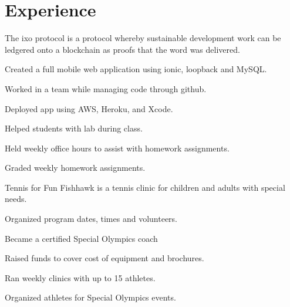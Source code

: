 \documentclass[]{deedy-resume-openfont}
\begin{document}
\begin{minipage}[t]{0.66\textwidth} 


\section{Experience}

\vspace{\topsep} %
\begin{tightemize}\item The ixo protocol is a protocol whereby sustainable development work can be ledgered onto a blockchain as proofs that the word was delivered. 
\end{tightemize}
\sectionsep

\begin{tightemize}
\item Created a full mobile web application using ionic, loopback and MySQL. \item Worked in a team while managing code through github. \item Deployed app using AWS, Heroku, and Xcode.\end{tightemize}
\sectionsep

\begin{tightemize}
\item Helped students with lab during class. \item Held weekly office hours to assist with homework assignments. \item Graded weekly homework assignments.
\end{tightemize}
\sectionsep

\begin{tightemize}
\item 	Tennis for Fun Fishhawk is a tennis clinic for children and adults with special needs.\item 	Organized program dates, times and volunteers. \item Became a certified Special Olympics coach \item	Raised funds to cover cost of equipment and brochures. \item  Ran weekly clinics with up to 15 athletes. \item Organized athletes for Special Olympics events.  \end{tightemize}
\sectionsep




\end{minipage}
\end{document}
